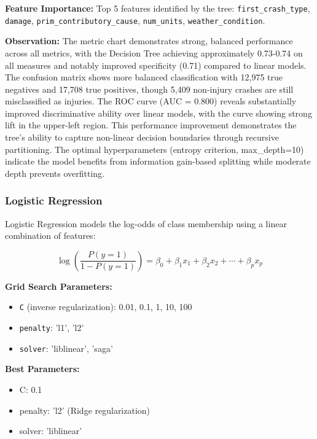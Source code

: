 \documentclass[stu,12pt,floatsintext]{apa7}
\begin{document}
\textbf{Feature Importance:} Top 5 features identified by the tree: \texttt{first\_crash\_type}, 
\texttt{damage}, \texttt{prim\_contributory\_cause}, \texttt{num\_units}, \texttt{weather\_condition}.

\textbf{Observation:} The metric chart demonstrates strong, balanced performance across all metrics, with the Decision Tree achieving approximately 
0.73-0.74 on all measures and notably improved specificity (0.71) compared to linear models. The confusion matrix shows more balanced classification 
with 12,975 true negatives and 17,708 true positives, though 5,409 non-injury crashes are still misclassified as injuries. The ROC curve (AUC = 0.800) 
reveals substantially improved discriminative ability over linear models, with the curve showing strong lift in the upper-left region. This 
performance improvement demonstrates the tree's ability to capture non-linear decision boundaries through recursive partitioning. The optimal 
hyperparameters (entropy criterion, max\_depth=10) indicate the model benefits from information gain-based splitting while moderate depth prevents 
overfitting.

\subsubsection{Logistic Regression}

Logistic Regression models the log-odds of class membership using a linear combination of features:

\begin{equation}
\log \left( \frac{P(y=1)}{1 - P(y=1)} \right) = \beta_0 + \beta_1 x_1 + \beta_2 x_2 + \cdots + \beta_p x_p
\end{equation}

\textbf{Grid Search Parameters:}
\begin{itemize}
    \item \texttt{C} (inverse regularization): 0.01, 0.1, 1, 10, 100
    \item \texttt{penalty}: 'l1', 'l2'
    \item \texttt{solver}: 'liblinear', 'saga'
\end{itemize}

\textbf{Best Parameters:}
\begin{itemize}
    \item C: 0.1
    \item penalty: 'l2' (Ridge regularization)
    \item solver: 'liblinear'
\end{itemize}
\end{document}
